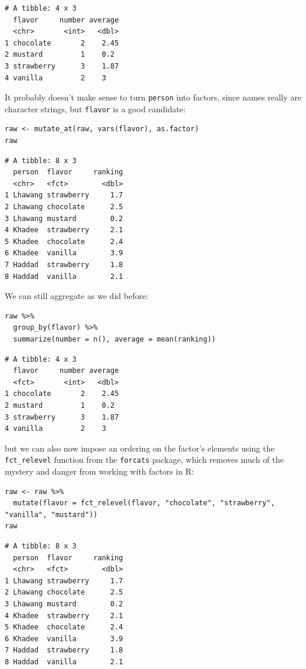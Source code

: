 \begin{lstlisting}
# A tibble: 4 x 3
  flavor     number average
  <chr>       <int>   <dbl>
1 chocolate       2    2.45
2 mustard         1    0.2 
3 strawberry      3    1.87
4 vanilla         2    3   
\end{lstlisting}

It probably doesn't make sense to turn \texttt{person} into factors,
since names really are character strings,
but \texttt{flavor} is a good candidate:

\begin{lstlisting}
raw <- mutate_at(raw, vars(flavor), as.factor)
raw
\end{lstlisting}

\begin{lstlisting}
# A tibble: 8 x 3
  person  flavor     ranking
  <chr>   <fct>        <dbl>
1 Lhawang strawberry     1.7
2 Lhawang chocolate      2.5
3 Lhawang mustard        0.2
4 Khadee  strawberry     2.1
5 Khadee  chocolate      2.4
6 Khadee  vanilla        3.9
7 Haddad  strawberry     1.8
8 Haddad  vanilla        2.1
\end{lstlisting}

We can still aggregate as we did before:

\begin{lstlisting}
raw %>%
  group_by(flavor) %>%
  summarize(number = n(), average = mean(ranking))
\end{lstlisting}

\begin{lstlisting}
# A tibble: 4 x 3
  flavor     number average
  <fct>       <int>   <dbl>
1 chocolate       2    2.45
2 mustard         1    0.2 
3 strawberry      3    1.87
4 vanilla         2    3   
\end{lstlisting}

\noindent
but we can also now impose an ordering on the factor's elements
using the \texttt{fct\_relevel} function from the \texttt{forcats} package,
which removes much of the mystery and danger from working with factors in R:

\begin{lstlisting}
raw <- raw %>%
  mutate(flavor = fct_relevel(flavor, "chocolate", "strawberry", "vanilla", "mustard"))
raw
\end{lstlisting}

\begin{lstlisting}
# A tibble: 8 x 3
  person  flavor     ranking
  <chr>   <fct>        <dbl>
1 Lhawang strawberry     1.7
2 Lhawang chocolate      2.5
3 Lhawang mustard        0.2
4 Khadee  strawberry     2.1
5 Khadee  chocolate      2.4
6 Khadee  vanilla        3.9
7 Haddad  strawberry     1.8
8 Haddad  vanilla        2.1
\end{lstlisting}

